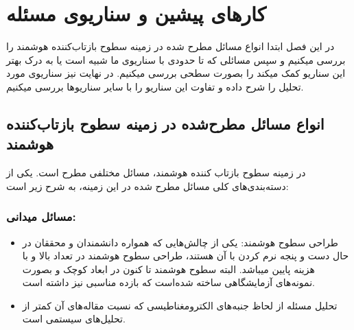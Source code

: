 \chapter{کارهای پیشین و سناریوی مسئله}
در این فصل ابتدا انواع مسائل مطرح شده در زمینه سطوح بازتاب‌کننده هوشمند را بررسی میکنیم و سپس مسائلی که تا حدودی با سناریوی ما شبیه است یا به درک بهتر این سناریو کمک میکند را بصورت سطحی بررسی میکنیم. در نهایت نیز سناریوی مورد تحلیل را شرح داده و تفاوت این سناریو را با سایر سناریوها بررسی میکنیم.
\section{
	انواع مسائل مطرح‌شده در زمینه سطوح بازتاب‌کننده\\ هوشمند
 }

در زمینه سطوح بازتاب کننده هوشمند، مسائل مختلفی مطرح است. یکی از دسته‌بندی‌های کلی مسائل مطرح شده در این زمینه، به شرح زیر است:

\newpage

\subsection{مسائل میدانی:}
\begin{itemize}
	\item 
	طراحی سطوح هوشمند: یکی از چالش‌هایی که همواره دانشمندان و محققان در حال دست و پنجه نرم کردن با آن هستند، طراحی سطوح هوشمند در تعداد بالا و با هزینه پایین میباشد. البته سطوح هوشمند تا کنون در ابعاد کوچک و بصورت نمونه‌های آزمایشگاهی ساخته شده‌است که بازده مناسبی نیز داشته است.
	\item 
	تحلیل مسئله از لحاظ جنبه‌های الکترومغناطیسی که نسبت مقاله‌های آن کمتر از تحلیل‌های سیستمی است.
\end{itemize}



